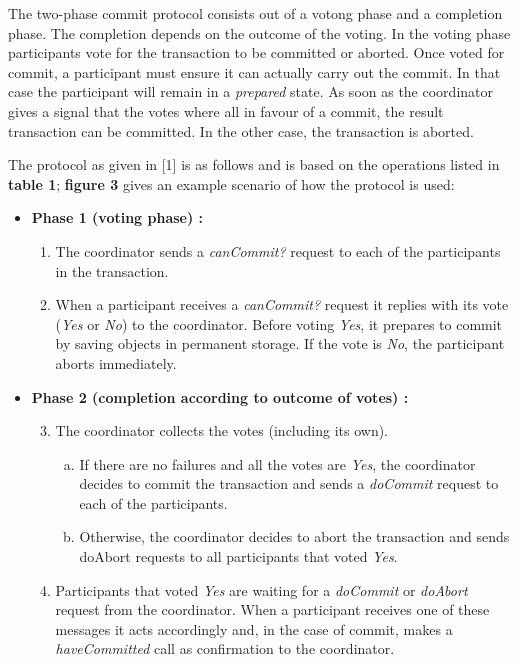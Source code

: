 The two-phase commit protocol consists out of a votong phase and a completion phase. The completion depends on the outcome of the voting. In the voting phase participants vote for the transaction to be committed or aborted. Once voted for commit, a participant must ensure it can actually carry out the commit. In that case the participant will remain in a \emph{prepared} state. As soon as the coordinator gives a signal that the votes where all in favour of a commit, the result transaction can be committed. In the other case, the transaction is aborted.

The protocol as given in [1] is as follows and is based on the operations listed in \textbf{table 1}; \textbf{figure 3} gives an example scenario of how the protocol is used:

\begin{itemize}
	\item 
		\textbf{Phase 1 (voting phase) :}
		\begin{enumerate}
			\item The coordinator sends a \emph{canCommit?} request to each of the participants in the transaction.
			\item When a participant receives a \emph{canCommit?} request it replies with its vote (\emph{Yes} or \emph{No}) to the coordinator. Before voting \emph{Yes}, it prepares to commit by saving objects in permanent storage. If the vote is \emph{No}, the participant aborts immediately.
		\end{enumerate}
	
	\item 
		\textbf{Phase 2 (completion according to outcome of votes) :}
		\begin{enumerate}
			\setcounter{enumi}{2}
			\item The coordinator collects the votes (including its own).
				\begin{enumerate}[a.]
					\item If there are no failures and all the votes are \emph{Yes}, the coordinator decides to commit the transaction and sends a \emph{doCommit} request to each of the participants.
					\item Otherwise, the coordinator decides to abort the transaction and sends doAbort requests to all participants that voted \emph{Yes}.
				\end{enumerate}
			\item Participants that voted \emph{Yes} are waiting for a \emph{doCommit} or \emph{doAbort} request from the coordinator. When a participant receives one of these messages it acts accordingly and, in the case of commit, makes a \emph{haveCommitted} call as confirmation to the coordinator.
		\end{enumerate}
\end{itemize}


